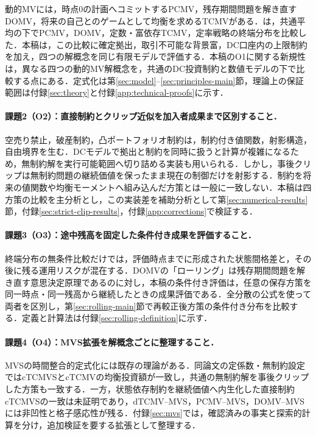 \documentclass[10pt,a4paper]{article}
\theoremstyle{plain}
\theoremstyle{definition}
\begin{document}
動的MVには，時点0の計画へコミットするPCMV\citep{LiNg2000,ZhouLi2000}，残存期間問題を解き直すDOMV\citep{PedersenPeskir2017,MenoncinVigna2020}，将来の自己とのゲームとして均衡を求めるTCMV\citep{BasakChabakauri2010,BjorkMurgoci2014,BjorkKhapkoMurgoci2017}がある．\citet{vanStadenDangForsyth2021}は，共通平均の下でPCMV，DOMV，定数・富依存TCMV，定率戦略の終端分布を比較した．本稿は，この比較に確定拠出，取引不可能な背景富，DC口座内の上限制約を加え，四つの解概念を同じ有限モデルで評価する．本稿のO1に関する新規性は，異なる四つの動的MV解概念を，共通のDC投資制約と数値モデルの下で比較する点にある．定式化は第\ref{sec:model}--\ref{sec:principles-main}節，理論上の保証範囲は付録\ref{sec:theory}と付録\ref{app:technical-proofs}に示す．

\paragraph{課題2（O2）：直接制約とクリップ近似を加入者成果まで区別すること．}
空売り禁止，破産制約，凸ポートフォリオ制約は，制約付き値関数，射影構造，自由境界を生む\citep{LiZhouLim2002,LiXu2016,BensoussanWongYamYung2014,GuanLiZhouZhou2022}．DCモデルで拠出と制約を同時に扱うと計算が複雑になるため，無制約解を実行可能範囲へ切り詰める実装も用いられる\citep{DiGiacintoFedericoGozziVigna2014,FerreiraMoriciVigna2025}．しかし，事後クリップは無制約問題の継続価値を保ったまま現在の制御だけを射影する．制約を将来の値関数や均衡モーメントへ組み込んだ方策とは一般に一致しない．本稿は四方策の比較を主分析とし，この実装差を補助分析として第\ref{sec:numerical-results}節，付録\ref{sec:strict-clip-results}，付録\ref{app:corrections}で検証する．

\paragraph{課題3（O3）：途中残高を固定した条件付き成果を評価すること．}
終端分布の無条件比較だけでは，評価時点までに形成された状態間格差と，その後に残る運用リスクが混在する．DOMVの「ローリング」は残存期間問題を解き直す意思決定原理であるのに対し，本稿の条件付き評価は，任意の保存方策を同一時点・同一残高から継続したときの成果評価である．全分散の公式を使って両者を区別し，第\ref{sec:rolling-main}節で再較正後方策の条件付き分布を比較する．定義と計算法は付録\ref{sec:rolling-definition}に示す．

\paragraph{課題4（O4）：MVS拡張を解概念ごとに整理すること．}
MVSの時間整合的定式化には既存の理論がある\citep{MuTianYang2019}．同論文の定係数・無制約設定ではcTCMVSとcTCMVの均衡投資額が一致し，共通の無制約解を事後クリップした方策も一致する．一方，状態依存制約を継続価値へ内生化した直接制約cTCMVSの一致は未証明であり，dTCMV--MVS，PCMV--MVS，DOMV--MVSには非凹性と格子感応性が残る．付録\ref{sec:mvs}では，確認済みの事実と探索的計算を分け，追加検証を要する拡張として整理する．
\end{document}
